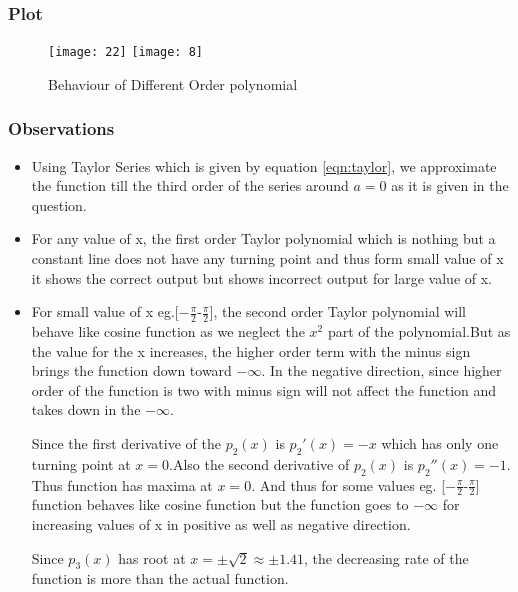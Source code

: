 \documentclass{article}
\begin{document}
\subsubsection{Plot}
\begin{figure}[!h]
    \centering
    \texttt{[image: 22]}
    \texttt{[image: 8]}
    \caption{Behaviour of Different Order polynomial}
    \label{fig:ques4}
\end{figure}

\subsubsection{Observations}
\begin{itemize}
    
    \item Using Taylor Series which is given by equation \ref{eqn:taylor}, we approximate the function till the third order of the series around $a = 0$ as it is given in the question.
    
    
    \item For any value of x, the first order Taylor polynomial which is nothing but a constant line does not have any turning point and thus form small value of x it shows the correct output but shows incorrect output for large value of x. 
    
    \item For small value of x eg.[$-\frac{\pi}{2}$-$\frac{\pi}{2}$], the second order Taylor polynomial will behave like cosine function as we neglect the $x^2$ part of the polynomial.But as the value for the x increases, the higher order term with the minus sign brings the function down toward $-\infty$. In the negative direction, since higher order of the function is two with minus sign will not affect the function and takes down in the $-\infty$.
    
    Since the first derivative of the $p_{2}(x)$ is $p_2'(x) =  -x$ which has only one turning point at $x = 0$.Also the second derivative of $p_{2}(x)$ is $p_2''(x) =  -1$. Thus function has maxima at $x = 0$. And thus for some values eg. [$-\frac{\pi}{2}$-$\frac{\pi}{2}$] function behaves like cosine function but the function goes to $-\infty$ for increasing values of x in positive as well as negative direction.
    
    Since $p_3(x)$ has root at $ x = \pm\sqrt{2} \approx \pm1.41$, the decreasing rate of the function is more than the actual function. 
    
    
\end{itemize}
\end{document}
